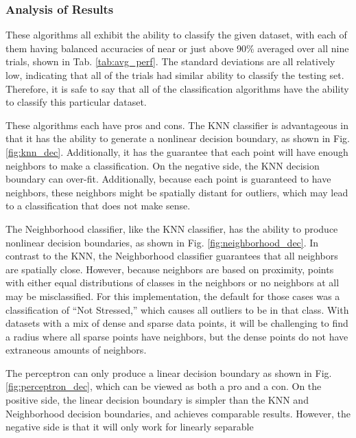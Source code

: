 \documentclass[a4paper, 11pt, titlepage]{article}
\newcommand{\figRef}[1]{Fig. \ref{#1}}
\newcommand{\tabRef}[1]{Tab. \ref{#1}}
\begin{document}
  \subsubsection{Analysis of Results}
  \par These algorithms all exhibit the ability to classify the given dataset,
  with each of them having balanced accuracies of near or just above 90\%
  averaged over all nine trials, shown in \tabRef{tab:avg_perf}.
  The standard deviations are all relatively low, indicating that all of the
  trials had similar ability to classify the testing set.
  Therefore, it is safe to say that all of the classification algorithms have
  the ability to classify this particular dataset.
  \par These algorithms each have pros and cons.
  The KNN classifier is advantageous in that it has the ability to generate a
  nonlinear decision boundary, as shown in \figRef{fig:knn_dec}.
  Additionally, it has the guarantee that each point will have enough neighbors
  to make a classification.
  On the negative side, the KNN decision boundary can over-fit.
  Additionally, because each point is guaranteed to have neighbors, these
  neighbors might be spatially distant for outliers, which may lead to a
  classification that does not make sense.
  \par The Neighborhood classifier, like the KNN classifier, has the ability to
  produce nonlinear decision boundaries, as shown in
  \figRef{fig:neighborhood_dec}.
  In contrast to the KNN, the Neighborhood classifier guarantees that all
  neighbors are spatially close.
  However, because neighbors are based on proximity, points with either equal
  distributions of classes in the neighbors or no neighbors at all may be
  misclassified.
  For this implementation, the default for those cases was a classification of
  ``Not Stressed,'' which causes all outliers to be in that class.
  With datasets with a mix of dense and sparse data points, it will be
  challenging to find a radius where all sparse points have neighbors, but the
  dense points do not have extraneous amounts of neighbors.
  \par The perceptron can only produce a linear decision boundary as shown in
  \figRef{fig:perceptron_dec}, which can be viewed as both a pro and a con.
  On the positive side, the linear decision boundary is simpler than the KNN
  and Neighborhood decision boundaries, and achieves comparable results.
  However, the negative side is that it will only work for linearly separable
\end{document}
